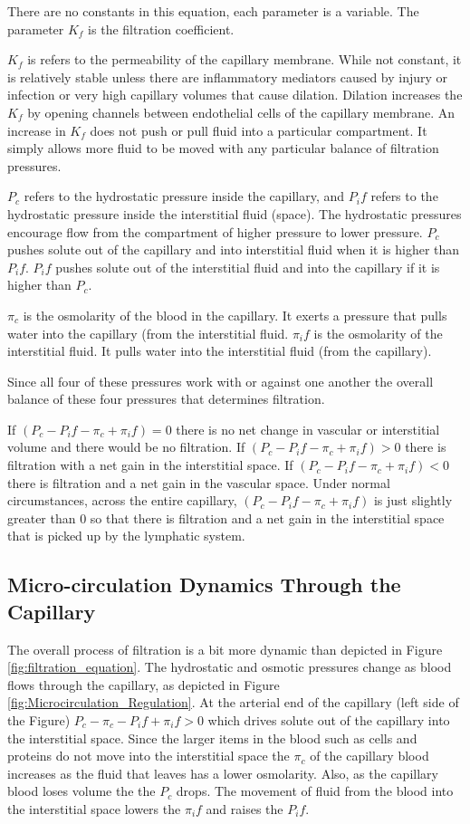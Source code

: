 There are no constants in this equation, each parameter is a variable. The parameter $K_f$ is the filtration coefficient. 

$K_f$ is refers to the permeability of the capillary membrane. While not constant, it is relatively stable unless there are inflammatory mediators caused by injury or infection or very high capillary volumes that cause dilation. Dilation increases the $K_f$ by opening channels between endothelial cells of the capillary membrane. An increase in $K_f$ does not push or pull fluid into a particular compartment. It simply allows more fluid to be moved with any particular balance of filtration pressures.

$P_c$ refers to the hydrostatic pressure inside the capillary, and $P_if$ refers to the hydrostatic pressure inside the interstitial fluid (space). The hydrostatic pressures encourage flow from the compartment of higher pressure to lower pressure. $P_c$ pushes solute out of the capillary and into interstitial fluid when it is higher than $P_if$. $P_if$ pushes solute out of the interstitial fluid and into the capillary if it is higher than $P_c$.

$\pi_c$ is the osmolarity of the blood in the capillary. It exerts a pressure that pulls water into the capillary (from the interstitial fluid.  $\pi_if$ is the osmolarity of the interstitial fluid. It pulls water into the interstitial fluid (from the capillary). 

Since all four of these pressures work with or against one another the overall balance of these four pressures that determines filtration. 

If $(P_c - P_if - \pi_c + \pi_if) = 0$ there is no net change in vascular or interstitial volume and there would be no filtration. If $(P_c - P_if - \pi_c + \pi_if) > 0$ there is filtration with a net gain in the interstitial space. If $(P_c - P_if - \pi_c + \pi_if) < 0$ there is filtration and a net gain in the vascular space. Under normal circumstances, across the entire capillary, $(P_c - P_if - \pi_c + \pi_if)$ is just slightly greater than 0 so that there is filtration and a net gain in the interstitial space that is picked up by the lymphatic system. 

\subsection{Micro-circulation Dynamics Through the Capillary}

The overall process of filtration is a bit more dynamic than depicted in Figure \ref{fig:filtration_equation}. The hydrostatic and osmotic pressures change as blood flows through the capillary, as depicted in Figure \ref{fig:Microcirculation_Regulation}. At the arterial end of the capillary (left side of the Figure) $P_c - \pi_c - P_if + \pi_if > 0$ which drives solute out of the capillary into the interstitial space. Since the larger items in the blood such as cells and proteins do not move into the interstitial space the $\pi_c$ of the capillary blood increases as the fluid that leaves has a lower osmolarity. Also, as the capillary blood loses volume the the $P_c$ drops. The movement of fluid from the blood into the interstitial space lowers the $\pi_if$ and raises the $P_if$.

